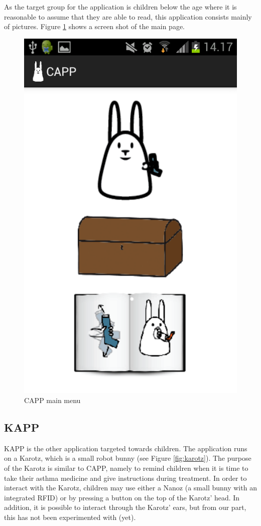 As the target group for the application is children below the age where it is reasonable to assume that they are able to read, this application consists mainly of pictures.  
Figure \ref{fig:capp-main-menu} shows a screen shot of the main page. 

\begin{figure}
		\centering
			\includegraphics[width=0.20\paperwidth]{Pictures/app-screenshots/capp_main_menu.png}
		\caption{CAPP main menu}
		\label{fig:capp-main-menu}
\end{figure}



\subsection{KAPP}
KAPP is the other application targeted towards children. The application runs on a Karotz\cite{karotz}, which is a small robot bunny (see Figure \ref{fig:karotz}). The purpose of the Karotz is similar to CAPP, namely to remind children when it is time to take their asthma medicine and give instructions during treatment. In order to interact with the Karotz, children may use either a Nanoz (a small bunny with an integrated RFID) or by pressing a button on the top of the Karotz' head. In addition, it is possible to interact through the Karotz' ears, but from our part, this has not been experimented with (yet).     


